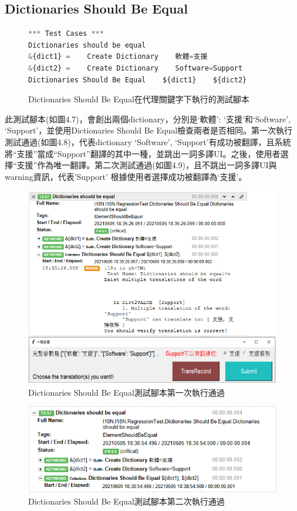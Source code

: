 \subsection{Dictionaries Should Be Equal}
\begin{figure}[H]
\begin{lstlisting}[language={python}]
*** Test Cases ***
Dictionaries should be equal
&{dict1} =    Create Dictionary    軟體=支援
&{dict2} =    Create Dictionary    Software=Support
Dictionaries Should Be Equal    ${dict1}    ${dict2}
\end{lstlisting}
\caption{Dictionaries Should Be Equal在代理關鍵字下執行的測試腳本}
\end{figure}
此測試腳本(如圖4.7)，會創出兩個dictionary，分別是{‘軟體’: ‘支援’}和{‘Software’, ‘Support’}，並使用Dictionaries Should Be Equal檢查兩者是否相同。第一次執行測試通過(如圖4.8)，代表dictionary {‘Software’, ‘Support’}有成功被翻譯，且系統將“支援”當成“Support”翻譯的其中一種，並跳出一詞多譯UI。之後，使用者選擇“支援”作為唯一翻譯。第二次測試通過(如圖4.9)，且不跳出一詞多譯UI與warning資訊，代表’Support’ 根據使用者選擇成功被翻譯為‘支援’。

\begin{figure}[H]
\includegraphics[width= \textwidth]{../論文截圖/4.1.3-2 dictionaries should be equal 1st run.png}
\caption{Dictionaries Should Be Equal測試腳本第一次執行通過}
\end{figure}

\begin{figure}[H]
\includegraphics[width= \textwidth]{../論文截圖/4.1.3-3 dictionaries should be equal 2nd run.png}
\caption{Dictionaries Should Be Equal測試腳本第二次執行通過}
\end{figure}

